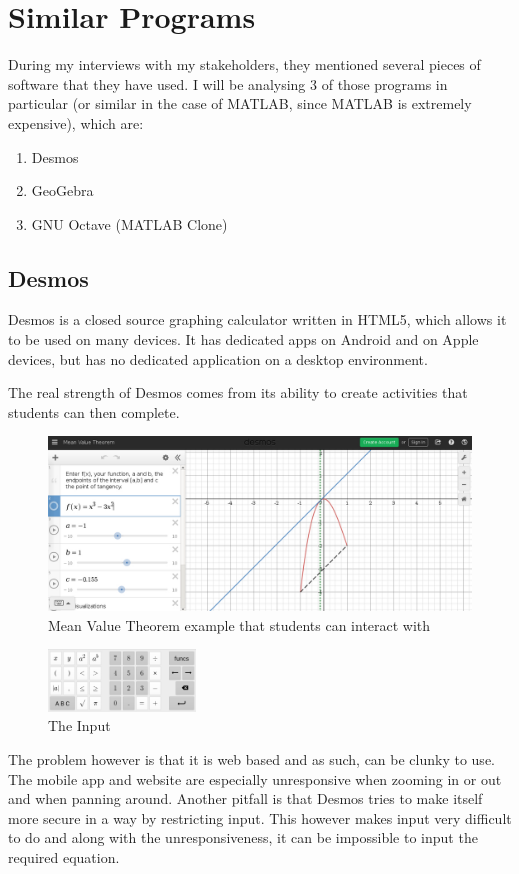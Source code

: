 \documentclass[../../../main.tex]{subfiles}
\begin{document}
\chapter{Similar Programs}
During my interviews with my stakeholders, they mentioned several pieces of software that they have used. I will be analysing 3 of those programs in particular (or similar in the case of MATLAB, since MATLAB is extremely expensive), which are:
\begin{enumerate}
\item Desmos \cite{desmos}
\item GeoGebra \cite{geogebra}
\item GNU Octave\cite{octave} (MATLAB\cite{matlab} Clone)
\end{enumerate}

\section{Desmos}
Desmos is a closed source graphing calculator written in HTML5, which allows it to be used on many devices. It has dedicated apps on Android and on Apple devices, but has no dedicated application on a desktop environment.

The real strength of Desmos comes from its ability to create activities that students can then complete.
\begin{figure}[H]
	\includegraphics[width=\textwidth]{images/desmosDemo}
	\caption{Mean Value Theorem example that students can interact with}
\end{figure}
\begin{figure}
	\includegraphics[width=0.35\textwidth]{images/desmosMobile}
	\caption{The Input}
\end{figure}
The problem however is that it is web based and as such, can be clunky to use. The mobile app and website are especially unresponsive when zooming in or out and when panning around. Another pitfall is that Desmos tries to make itself more secure in a way by restricting input. This however makes input very difficult to do and along with the unresponsiveness, it can be impossible to input the required equation.
\end{document}
